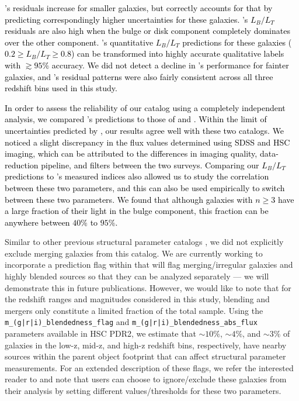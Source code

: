 \textcolor{black}{\gampen{}'s residuals increase for smaller galaxies, but \gampen{} correctly accounts for that by predicting correspondingly higher uncertainties for these galaxies. \gampen{}'s $L_B/L_T$ residuals are also high when the bulge or disk component completely dominates over the other component. \gampen{}'s quantitative $L_B/L_T$ predictions for these galaxies ($0.2 \geq L_B/L_T \geq 0.8$) can be transformed into highly accurate qualitative labels with $\gtrsim95\%$ accuracy. We did not detect a decline in \gampen{}'s performance for fainter galaxies, and \gampen{}'s residual patterns were also fairly consistent across all three redshift bins used in this study.}

\textcolor{black}{In order to assess the reliability of our catalog using a completely independent analysis, we compared \gampen{}'s predictions to those of \citet{simard_11} and \citet{hsc_sersic}. Within the limit of uncertainties predicted by \gampen{}, our results agree well with these two catalogs. We noticed a slight discrepancy in the flux values determined using SDSS and HSC imaging, which can be attributed to the differences in imaging quality, data-reduction pipeline, and filters between the two surveys. Comparing our $L_B/L_T$ predictions to \citet{hsc_sersic}'s measured \sersic{} indices also allowed us to study the correlation between these two parameters, and this can also be used empirically to switch between these two parameters. We found that although galaxies with $n\geq3$ have a large fraction of their light in the bulge component, this fraction can be anywhere between $40\%$ to $95\%$.}

Similar to other previous structural parameter catalogs \citep[e.g.,][]{simard_11,tarsitano_18}, we did not explicitly exclude merging galaxies from this catalog. We are currently working to incorporate a prediction flag within \gampen{} that will flag merging/irregular galaxies and highly blended sources so that they can be analyzed separately --- we will demonstrate this in future publications. However, we would like to note that for the redshift ranges and magnitudes considered in this study, blending and mergers only constitute a limited fraction of the total sample. Using the \texttt{m\_(g|r|i)\_blendedness\_flag} and \texttt{m\_(g|r|i)\_blendedness\_abs\_flux} parameters available in HSC PDR2, we estimate that $\sim10\%$, $\sim4\%$, and $\sim3\%$ of galaxies in the low-z, mid-z, and high-z redshift bins, respectively, have nearby sources within the parent object footprint that can affect structural parameter measurements. For an extended description of these flags, we refer the interested reader to \citet{hsc_pipeline} and note that users can choose to ignore/exclude these galaxies from their analysis by setting different values/thresholds for these two parameters. 

